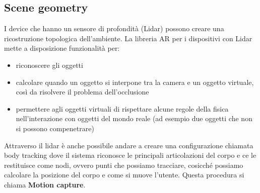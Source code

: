 \subsection{Scene geometry}
I device che hanno un sensore di profondità (Lidar) possono creare una ricostruzione topologica dell'ambiente. La libreria AR per i dispositivi con Lidar mette a disposizione funzionalità per:
\begin{itemize}
    \item riconoscere gli oggetti
    \item calcolare quando un oggetto si interpone tra la camera e un oggetto virtuale, così da risolvere il problema dell'occlusione
    \item permettere agli oggetti virtuali di rispettare alcune regole della fisica nell'interazione con oggetti del mondo reale (ad esempio due oggetti che non si possono compenetrare)
\end{itemize} 
Attraverso il lidar è anche possibile andare a creare una configurazione chiamata body tracking dove il sistema riconosce le principali articolazioni del corpo e ce le restituisce come nodi, ovvero punti che possiamo tracciare, cosicché possiamo calcolare la posizione del corpo e come si muove l'utente. Questa procedura si chiama \textbf{Motion capture}.
